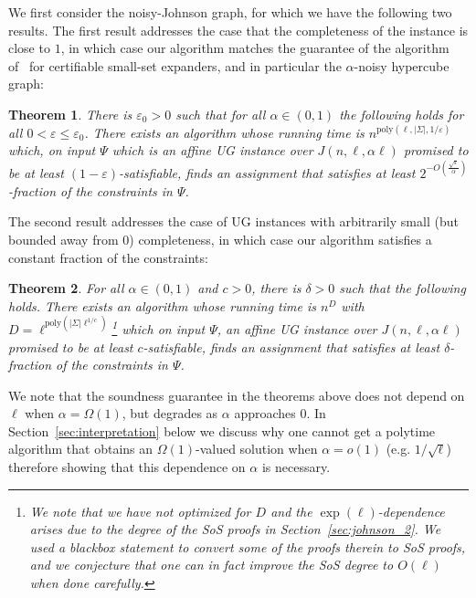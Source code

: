 \documentclass[11pt]{article}
\def \poly {\mathrm{poly}}
\def \eps {{\varepsilon}}
\newtheorem{theorem}{Theorem}[section]
\theoremstyle{definition}
\begin{document}
We first consider the noisy-Johnson graph, 
for which we have the following two results.
The first result addresses the case that 
the completeness of the instance is close to 
$1$, in which case our algorithm matches the 
guarantee of the algorithm of~\cite{BBKSS} 
for certifiable small-set expanders, and in particular the $\alpha$-noisy hypercube graph:

\begin{theorem}\label{thm:main_johnson_close_to_1}
There is $\eps_0>0$
such that for all $\alpha\in (0,1)$ 
the following holds for all $0<\eps\leq \eps_0$.
There exists an algorithm whose running time is $n^{\poly(\ell,|\Sigma|,1/\eps)}$ which, on input
$\Psi$ which is an affine UG instance over $J(n,\ell,\alpha\ell)$ promised to be at least $(1-\eps)$-satisfiable, finds an assignment that satisfies 
at least $2^{-O\left(\frac{\sqrt{\eps}}{\alpha}\right)}$-fraction of the constraints in $\Psi$.
\end{theorem}



The second result addresses the case of UG instances with arbitrarily small (but bounded away from $0$) completeness, in which case our algorithm satisfies a constant fraction of the constraints:
\begin{theorem}\label{thm:main_johnson}
For all $\alpha\in (0,1)$ and $c>0$, there is $\delta>0$ such that the following holds. 
There exists an algorithm whose running time is $n^{D}$ with $D = \ell^{\poly(|\Sigma|\ell^{1/c})}$\footnote{We note that we have not optimized for $D$ and the $\exp(\ell)$-dependence arises due to the degree of the SoS proofs in Section~\ref{sec:johnson_2}. We used a blackbox statement to convert some of the proofs therein to SoS proofs, and we conjecture that one can in fact improve the SoS degree to $O(\ell)$ when done carefully.} which on input
$\Psi$, an affine UG instance over $J(n,\ell,\alpha \ell)$ promised to be at least $c$-satisfiable, finds an assignment that satisfies 
at least $\delta$-fraction of the constraints in $\Psi$.
\end{theorem}

We note that the soundness guarantee in the theorems above does not depend on $\ell$ when $\alpha = \Omega(1)$, but degrades as $\alpha$ approaches $0$. In Section~\ref{sec:interpretation} below we discuss why one cannot get a polytime algorithm that obtains an $\Omega(1)$-valued solution when $\alpha = o(1)$ (e.g. $1/\sqrt{\ell}$) therefore showing that this dependence on $\alpha$ is necessary.
\end{document}
